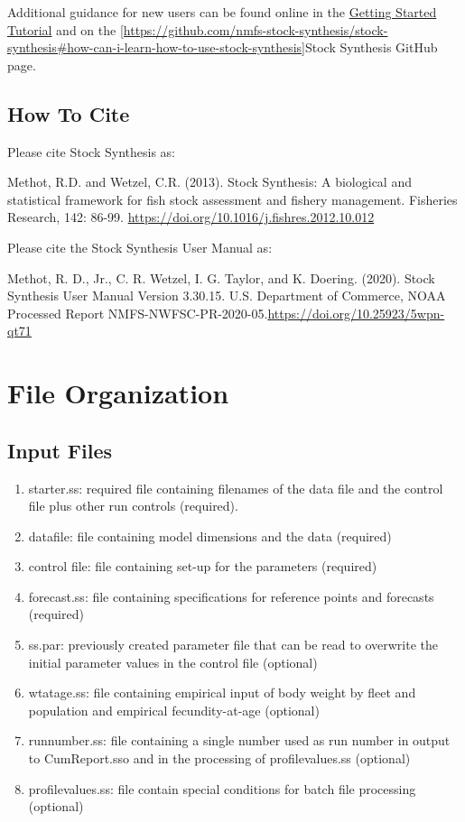 Additional guidance for new users can be found online in the \href{https://nmfs-stock-synthesis.github.io/doc/Getting_Started_SS.html}{Getting Started Tutorial} and on the \ref{https://github.com/nmfs-stock-synthesis/stock-synthesis#how-can-i-learn-how-to-use-stock-synthesis}{Stock Synthesis GitHub} page. 

  \subsection{How To Cite}
  
Please cite Stock Synthesis as:

Methot, R.D. and Wetzel, C.R. (2013). Stock Synthesis: A biological and statistical
framework for fish stock assessment and fishery management. Fisheries Research, 
142: 86-99. \href{https://doi.org/10.1016/j.fishres.2012.10.012}{https://doi.org/10.1016/j.fishres.2012.10.012}

Please cite the Stock Synthesis User Manual as:

Methot, R. D., Jr., C. R. Wetzel, I. G. Taylor, and K. Doering. (2020). Stock Synthesis User Manual Version 3.30.15. U.S. Department of Commerce, NOAA Processed Report NMFS-NWFSC-PR-2020-05.\href{https://doi.org/10.25923/5wpn-qt71}{https://doi.org/10.25923/5wpn-qt71}

\pagebreak
		
\section{File Organization}\label{FileOrganization}		
	\subsection{Input Files}
	\begin{enumerate}
		\item starter.ss: required file containing filenames of the data file and the control file plus other run controls (required).
		\item datafile: file containing model dimensions and the data (required)
		\item control file: file containing set-up for the parameters (required)
		\item forecast.ss: file containing specifications for reference points and forecasts (required) 
		\item ss.par: previously created parameter file that can be read to overwrite the initial parameter values in the control file (optional)
		\item wtatage.ss: file containing empirical input of body weight by fleet and population and empirical fecundity-at-age (optional)
		\item runnumber.ss: file containing a single number used as run number in output to CumReport.sso and in the processing of profilevalues.ss (optional)
		\item profilevalues.ss: file contain special conditions for batch file processing (optional)
	\end{enumerate}
	

